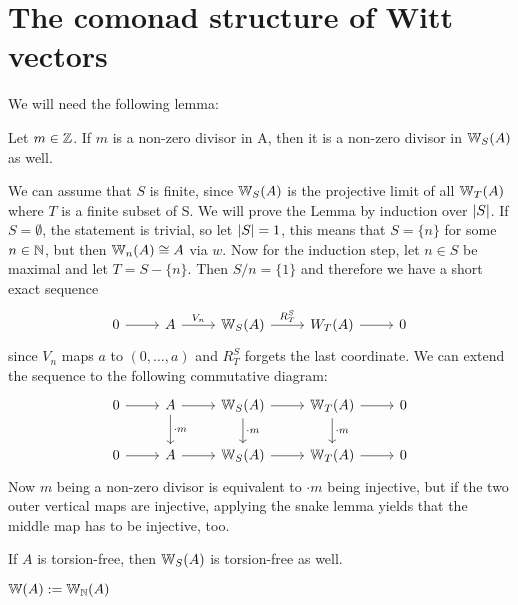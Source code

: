 \section{The comonad structure of Witt vectors}
We will need the following lemma:
\begin{lemma}\label{lem: non-zero divisor}
    Let $m \in \mathbb{Z}$. If $m$ is a non-zero divisor in A, then it is a
    non-zero divisor in $\mathbb{W}_S(A)$ as well.
\end{lemma}
\begin{beweis}
    We can assume that $S$ is finite, since $\mathbb{W}_S(A)$ is the projective limit
    of all $\mathbb{W}_T(A)$ where $T$ is a finite subset of S.
    We will prove the Lemma by induction over $\lvert S\rvert$.
    If $S = \emptyset$, the statement is trivial, so let $\lvert S\rvert = 1$, this means
    that $S = \{n\}$ for some $n \in \mathbb{N}$, but then $\mathbb{W}_{n}(A) \cong A$ via $w$.
    Now for the induction step, let $n \in S$ be maximal and let $T = S - \{n\}$.
    Then $S/n = \{1\}$ and therefore we have a short exact sequence 
    \[
    \begin{tikzcd}
        0 \arrow[r]
          & A \arrow[r,"V_n"]
            & \W_S(A) \arrow[r,"R_T^S"]
              & W_T(A) \arrow[r]
                & 0
    \end{tikzcd}
    \]
    since $V_n$ maps $a$ to $(0,\dots,a)$ and $R_T^S$ forgets the last coordinate.
    We can extend the sequence to the following commutative diagram:
    \[
    \begin{tikzcd}
        0 \arrow[r] 
        & A \arrow[r] \arrow[d,"\cdot m"] 
          & \W_S(A) \arrow[r] \arrow[d,"\cdot m"]
            & \W_T(A) \arrow[d,"\cdot m"] \arrow[r]
                & 0 \\
        0 \arrow[r]
           & A \arrow[r]
            & \W_S(A) \arrow[r]
              & \W_T(A) \arrow[r]
                & 0 
    \end{tikzcd}
    \]
    Now $m$ being a non-zero divisor is equivalent to $\cdot m$ being injective, but if the
    two outer vertical maps are injective, applying the snake lemma yields that the middle map has to be 
    injective, too.
\end{beweis}
\begin{cor} 
    \label{cor: A torsion-free implies W(A) torsion-free}
    If $A$ is torsion-free, then $\mathbb{W}_S(A)$ is torsion-free as well.
\end{cor}
\begin{definition}
    $\mathbb{W}(A) := \mathbb{W}_{\mathbb{N}}(A)$
\end{definition}
